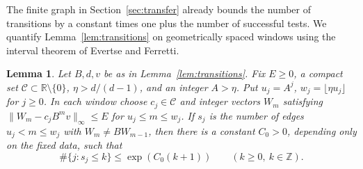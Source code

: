 \documentclass[11pt,reqno,a4paper]{amsart}
\newtheorem{lemma}[theorem]{Lemma}
\theoremstyle{remark}
\begin{document}
The finite graph in Section~\ref{sec:transfer} already bounds the
number of transitions by a constant times one plus the number of
successful tests. We quantify Lemma~\ref{lem:transitions} on
geometrically spaced windows using the interval theorem of Evertse
and Ferretti.

\begin{lemma}\label{lem:app-count-transitions}
Let \(B,d,v\) be as in Lemma~\ref{lem:transitions}. Fix \(E\ge0\),
a compact set \(\mathcal C\subset\mathbb R\setminus\{0\}\),
\(\eta>d/(d-1)\), and an integer \(A>\eta\). Put \(u_j=A^j\),
\(w_j=\lfloor\eta u_j\rfloor\) for \(j\ge0\). In each window choose
\(c_j\in\mathcal C\) and integer vectors \(W_m\) satisfying
\(\|W_m-c_j B^m v\|_\infty\le E\) for \(u_j\le m\le w_j\).
If \(s_j\) is the number of edges \(u_j<m\le w_j\) with
\(W_m\ne BW_{m-1}\), then there is a constant \(C_0>0\), depending
only on the fixed data, such that
\begin{equation}\label{eq:app-count-exceptions}
 \#\{j:s_j\le k\}\le\exp(C_0(k+1))\qquad(k\ge0,\ k\in\mathbb Z).
\end{equation}
\end{lemma}
\end{document}

